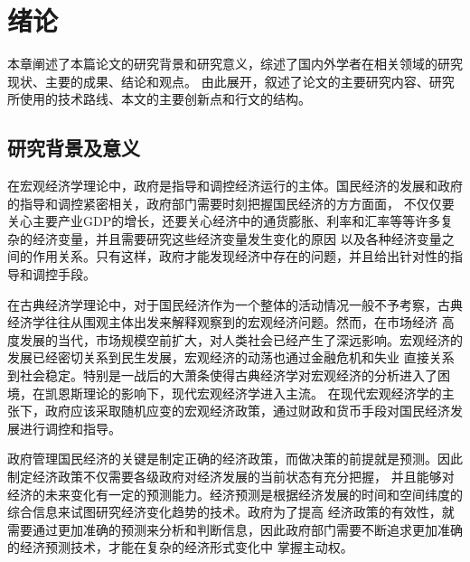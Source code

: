 \section{绪论}
本章阐述了本篇论文的研究背景和研究意义，综述了国内外学者在相关领域的研究现状、主要的成果、结论和观点。
由此展开，叙述了论文的主要研究内容、研究所使用的技术路线、本文的主要创新点和行文的结构。

\subsection{研究背景及意义}
在宏观经济学理论中，政府是指导和调控经济运行的主体。国民经济的发展和政府的指导和调控紧密相关，政府部门需要时刻把握国民经济的方方面面，
不仅仅要关心主要产业GDP的增长，还要关心经济中的通货膨胀、利率和汇率等等许多复杂的经济变量，并且需要研究这些经济变量发生变化的原因
以及各种经济变量之间的作用关系。只有这样，政府才能发现经济中存在的问题，并且给出针对性的指导和调控手段。

在古典经济学理论中，对于国民经济作为一个整体的活动情况一般不予考察，古典经济学往往从围观主体出发来解释观察到的宏观经济问题。然而，在市场经济
高度发展的当代，市场规模空前扩大，对人类社会已经产生了深远影响。宏观经济的发展已经密切关系到民生发展，宏观经济的动荡也通过金融危机和失业
直接关系到社会稳定。特别是一战后的大萧条使得古典经济学对宏观经济的分析进入了困境，在凯恩斯理论的影响下，现代宏观经济学进入主流。
在现代宏观经济学的主张下，政府应该采取随机应变的宏观经济政策，通过财政和货币手段对国民经济发展进行调控和指导。

政府管理国民经济的关键是制定正确的经济政策，而做决策的前提就是预测。因此制定经济政策不仅需要各级政府对经济发展的当前状态有充分把握，
并且能够对经济的未来变化有一定的预测能力。经济预测是根据经济发展的时间和空间纬度的综合信息来试图研究经济变化趋势的技术。政府为了提高
经济政策的有效性，就需要通过更加准确的预测来分析和判断信息，因此政府部门需要不断追求更加准确的经济预测技术，才能在复杂的经济形式变化中
掌握主动权。


